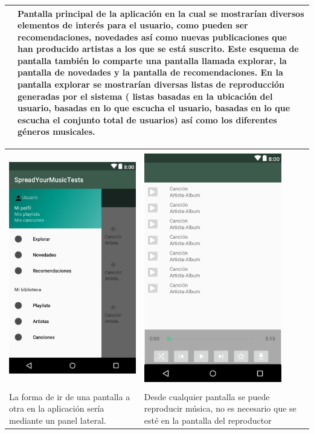 \begin{tabular}{ p{6cm} p{6cm}}
&
Pantalla principal de la aplicación en la cual se mostrarían diversos elementos de interés para el usuario, como pueden ser recomendaciones, novedades así como nuevas publicaciones que han producido artistas a los que se está suscrito.
Este esquema de pantalla también lo comparte una pantalla llamada explorar, la pantalla de novedades y la pantalla de recomendaciones.
En la pantalla explorar se mostrarían diversas listas de reproducción generadas por el sistema ( listas basadas en la ubicación del usuario, basadas en lo que escucha el usuario, basadas en lo que escucha el conjunto total de usuarios) así como los diferentes géneros musicales.  \\
\hline
\end{tabular}

\begin{tabular}{ p{6cm} p{6cm}}
\hline
\\
\includegraphics[width=6cm]{Figures/android/Home-NavigationDrawer.png}
&
\includegraphics[width=6cm]{Figures/android/lista-reproductor.png} \\
\hline
\\
La forma de ir de una pantalla a otra en la aplicación sería mediante un panel lateral.
&
Desde cualquier pantalla se puede reproducir música, no es necesario que se esté en la pantalla del reproductor \\
\hline
\end{tabular}

